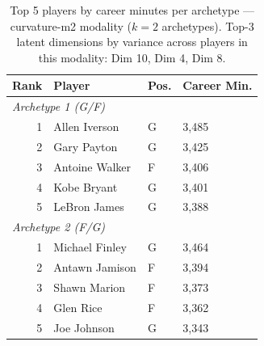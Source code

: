 \begin{table}[htbp]
  \centering\small
  \begin{tabular}{rlll}
    \toprule
    Rank & Player & Pos. & Career Min. \\
    \midrule
    \multicolumn{4}{l}{\textit{Archetype 1 (G/F)}} \\
    \midrule
    1 & Allen Iverson & G & 3,485 \\
    2 & Gary Payton & G & 3,425 \\
    3 & Antoine Walker & F & 3,406 \\
    4 & Kobe Bryant & G & 3,401 \\
    5 & LeBron James & G & 3,388 \\
    \midrule[0.4pt]
    \multicolumn{4}{l}{\textit{Archetype 2 (F/G)}} \\
    \midrule
    1 & Michael Finley & G & 3,464 \\
    2 & Antawn Jamison & F & 3,394 \\
    3 & Shawn Marion & F & 3,373 \\
    4 & Glen Rice & F & 3,362 \\
    5 & Joe Johnson & G & 3,343 \\
    \bottomrule
  \end{tabular}
  \caption{Top 5 players by career minutes per archetype --- curvature-m2 modality ($k=2$ archetypes). Top-3 latent dimensions by variance across players in this modality: Dim 10, Dim 4, Dim 8.}
  \label{tab:arch_reps_curvature_m2}
\end{table}

